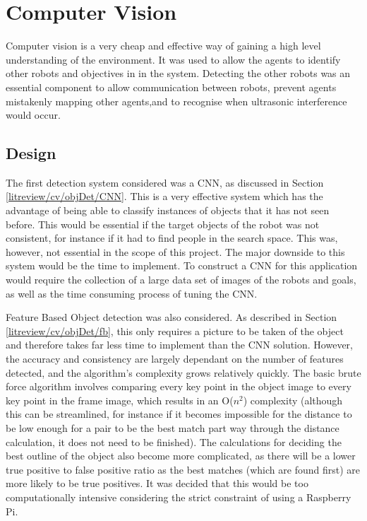 \section{Computer Vision}\label{soft/cv}
Computer vision is a very cheap and effective way of gaining a high level understanding of the environment. It was used to allow the agents to identify other robots and objectives in in the system. Detecting the other robots was an essential component to allow communication between robots, prevent agents mistakenly mapping other agents,and to recognise when ultrasonic interference would occur. 

\subsection{Design}\label{soft/cv/design}
The first detection system considered was a CNN, as discussed in Section \ref{litreview/cv/objDet/CNN}. This is a very effective system which has the advantage of 
being able to classify instances of objects that it has not 
seen before. This would be essential if the target objects of 
the robot was not consistent, for instance if it had to find 
people in the search space. This was, however, not essential 
in the scope of this project. The major downside to this 
system would be the time to implement. To construct a CNN for 
this application would require the collection of a large data 
set of images of the robots and goals, as well as the time 
consuming process of tuning the CNN. 

Feature Based Object detection was also considered. As described in Section \ref{litreview/cv/objDet/fb}, this only requires a picture to be taken of the object and therefore takes far less time to 
implement than the CNN solution. However, the accuracy and 
consistency are largely dependant on the number of features 
detected, and the algorithm's complexity grows relatively 
quickly. The basic brute force algorithm involves comparing 
every key point in the object image to every key point in the 
frame image, which results in an O($n^2$) complexity (although 
this can be streamlined, for instance if it becomes impossible 
for the distance to be low enough for a pair to be the best 
match part way through the distance calculation, it does not 
need to be finished). The calculations for deciding the best 
outline of the object also become more complicated, as there 
will be a lower true positive to false positive ratio as the 
best matches (which are found first) are more likely to be 
true positives. It was decided that this would be too  
computationally intensive considering the strict constraint of 
using a Raspberry Pi. 

